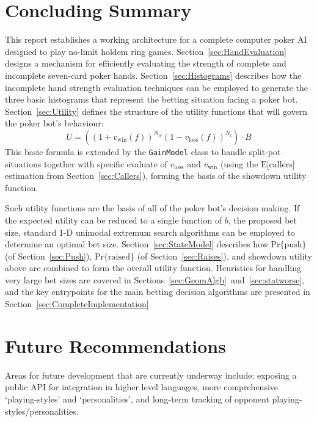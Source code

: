 


\chapter{Concluding Summary}
\label{sec:Summary}

This report establishes a working architecture for a complete computer poker AI designed to play no-limit holdem ring games.
Section~\ref{sec:HandEvaluation} designs a mechanism for efficiently evaluating the strength of complete and incomplete seven-card poker hands.
Section~\ref{sec:Histograms} describes how the incomplete hand strength evaluation techniques can be employed to generate the three basic histograms that represent the betting situation facing a poker bot.
Section~\ref{sec:Utility} defines the structure of the utility functions that will govern the poker bot's behaviour:
\[
U = \left( \left( 1 + v_{\mathrm{win}} \left( f \right) \right)^{N_w} \left( 1 - v_{\mathrm{loss}} \left( f \right) \right)^{N_l} \right) \cdot B
\]
This basic formula is extended by the \texttt{GainModel} class to handle split-pot situations together with specific evaluate of $v_{\mathrm{loss}}$ and $v_{\mathrm{win}}$ (using the $\mathrm{E[callers}]$ estimation from Section~\ref{sec:Callers}), forming the basis of the showdown utility function.

Such utility functions are the basis of all of the poker bot's decision making.
If the expected utility can be reduced to a single function of $b$, the proposed bet size, standard 1-D unimodal extremum search algorithms can be employed to determine an optimal bet size.
Section~\ref{sec:StateModel} describes how $\mathrm{Pr\{push}\}$ (of Section~\ref{sec:Push}), $\mathrm{Pr\{raised}\}$ (of Section~\ref{sec:Raises}), and showdown utility above are combined to form the overall utility function.
Heuristics for handling very large bet sizes are covered in Sections~\ref{sec:GeomAlgb}~and~\ref{sec:statworse}, and the key entrypoints for the main betting decision algorithms are presented in Section~\ref{sec:CompleteImplementation}.



\chapter{Future Recommendations}
\label{sec:FutureDirection}

Areas for future development that are currently underway include: exposing a public API for integration in higher level languages, more comprehensive `playing-styles' and `personalities', and long-term tracking of opponent playing-styles/personalities.

